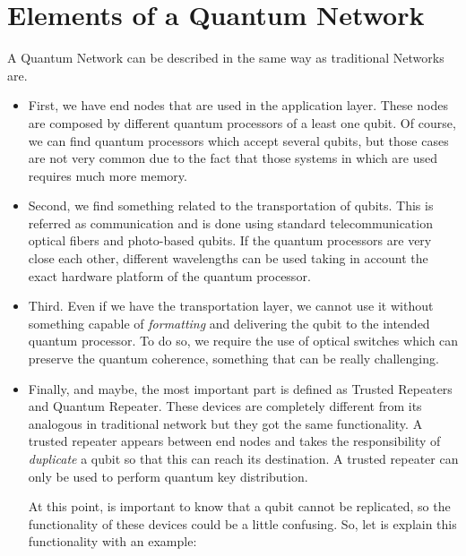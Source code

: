 \documentclass[12pt,journal]{journal}
\begin{document}


\section{Elements of a Quantum Network}

A Quantum Network can be described in the same way as traditional Networks are.

\begin{itemize}

\item First, we have end nodes that are used in the application layer. These nodes are composed by different quantum processors of a least one qubit. Of course, we can find quantum processors which accept several qubits, but those cases are not very common due to the fact that those systems in which are used requires much more memory. 

\item Second, we find something related to the transportation of qubits. This is referred as communication and is done using standard telecommunication optical fibers and photo-based qubits. If the quantum processors are very close each other, different wavelengths can be used taking in account the exact hardware platform of the quantum processor.

\item Third. Even if we have the transportation layer, we cannot use it without something capable of \textit{formatting} and delivering the qubit to the intended quantum processor. To do so, we require the use of optical switches which can preserve the quantum coherence, something that can be really challenging.

\item Finally, and maybe, the most important part is defined as Trusted Repeaters and Quantum Repeater. These devices are completely different from its analogous in traditional network but they got the same functionality. A trusted repeater appears between end nodes \citep{van2014quantum} and takes the responsibility of \textit{duplicate} a qubit so that this can reach its destination. A trusted repeater can only be used to perform quantum key distribution.

At this point, is important to know that a qubit cannot be replicated, so the functionality of these devices could be a little confusing.
So, let is explain this functionality with an example:


\end{itemize}
\end{document}
